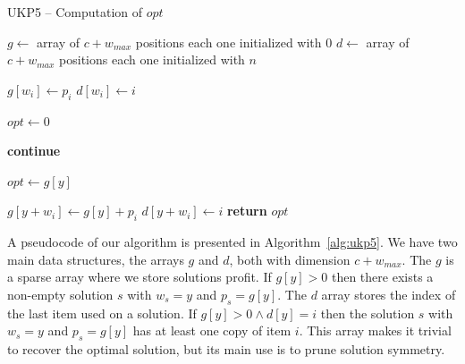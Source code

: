 \documentclass[runningheads,a4paper]{llncs}
\begin{document}
\begin{algorithm}[!t]
\caption{UKP5 -- Computation of $opt$}\label{alg:ukp5}
\begin{algorithmic}[1]
  \State \(g \gets\) array of \(c + w_{max}\) positions each one initialized with \(0\)\label{create_g}
  \State \(d \gets\) array of \(c + w_{max}\) positions each one initialized with \(n\)\label{create_d}
  
  \label{begin_trivial_bounds}
      \State \(g[w_i] \gets p_i\)
      \State \(d[w_i] \gets i\)
    \EndIf
  \EndFor\label{end_trivial_bounds}

  \State \(opt \gets 0\)\label{init_opt}

  \label{main_ext_loop_begin}
    \label{if_less_than_opt_begin}
    	\State \textbf{continue}\label{alg:continue}
    \EndIf\label{if_less_than_opt_end}
    
    \State \(opt \gets g[y]\)\label{update_opt}
    
    \label{main_inner_loop_begin}
      \label{if_new_lower_bound_begin}
        \State \(g[y + w_i] \gets g[y] + p_i\)
        \State \(d[y + w_i] \gets i\)
      \EndIf\label{if_new_lower_bound_end}
    \EndFor\label{main_inner_loop_end}
  \EndFor\label{main_ext_loop_end}
  \State \textbf{return} \(opt\)

\EndProcedure
\end{algorithmic}
\end{algorithm}

A pseudocode of our algorithm is presented in Algorithm~\ref{alg:ukp5}.
We have two main data structures, the arrays \(g\) and \(d\), both with dimension \(c + w_{max}\). 
The \(g\) is a sparse array where we store solutions profit. If \(g[y] > 0\) then there exists a non-empty solution \(s\) with \(w_s = y\) and \(p_s = g[y]\). 
The \(d\) array stores the index of the last item used on a solution. If \(g[y] > 0 \land d[y] = i\) then the solution \(s\) with \(w_s = y\) and \(p_s = g[y]\) has at least one copy of item \(i\). 
This array makes it trivial to recover the optimal solution, but its main use is to prune solution symmetry.
\end{document}

